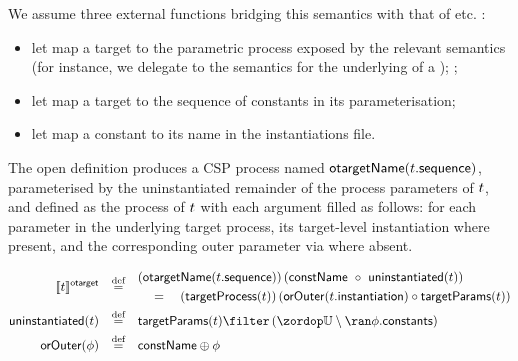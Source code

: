 We assume three external functions bridging this semantics with that of
\robochart{} etc. :

\begin{itemize}
\item
	let  map a target to the parametric
	process exposed by the relevant \tockcsp{} semantics (for instance,
	we delegate to the \robochart{} semantics for the underlying
	\mrcmodule{} of a \mrcmoduletarget);
	;
\item
	let  map a target to the sequence of
	constants in its parameterisation;
\item
	let  map a constant to its name in the \robochart{}
	instantiations file.
\end{itemize}

\begin{defn}

The open definition produces a CSP process named
\(\mathsf{otargetName}(t.\mathsf{sequence})\), parameterised by the
uninstantiated remainder of the process parameters of \(t\), and
defined as the process of \(t\) with each argument filled as follows:
for each parameter in the underlying target process, its
target-level instantiation where present, and the corresponding outer
parameter via  where absent.

%
\begin{align*}
	\otargetsema{\atarget}
\quad\defeq\quad&
\begin{aligned}
&
	(\otargetnameOf{\field{\atarget}{sequence}})
	\left(
		\funcname{constName}\ \circ\ \funcname{uninstantiated}(\atarget)
	\right)
\\
&
	\quad=\quad
	(\funcname{targetProcess}(\atarget))
	\left(
	\funcname{orOuter}(\field{\atarget}{instantiation})
	\circ
	\funcname{targetParams}(\atarget)
	\right)
\end{aligned}
\\
	\funcname{uninstantiated}(\atarget)
\quad\defeq\quad&
	\funcname{targetParams}(\atarget)
	\filter
	\left(\universe \setminus \ran \field{\aninst}{constants}\right)
\\
	\funcname{orOuter}(\aninst)
\quad\defeq\quad&
	\funcname{constName} \oplus \aninst
\end{align*}
\end{defn}

